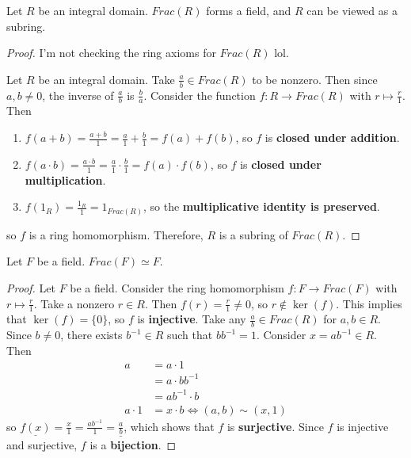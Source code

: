 \documentclass [12pt] {article}
\newenvironment{theorem}[1]{\begin{tcolorbox}[title={Theorem #1},colback=green!5!white,colframe=black!75!green]}{\end{tcolorbox}}
\newenvironment{corollary}[1]{\begin{tcolorbox}[title={Corollary #1}]}{\end{tcolorbox}}
\renewcommand{\bf}[1]{\textbf{{#1}}}
\newcommand{\ul}[1]{\underline{{#1}}}
\begin{document}
\begin{theorem}{}
    Let $R$ be an integral domain. $Frac(R)$ forms a field, and $R$ can be viewed as a subring.
\end{theorem}
\begin{proof}
    I'm not checking the ring axioms for $Frac(R)$ lol.
    \vspace{0.5em}

    Let $R$ be an integral domain. Take $\frac{a}{b} \in Frac(R)$ to be nonzero. Then since
    $a, b \neq 0$, the inverse of $\frac{a}{b}$ is $\frac{b}{a}$. Consider the function
    $f : R \to Frac(R)$ with $r \mapsto \frac{r}{1}$. Then
    \begin{enumerate}[label=(\arabic*)]
        \item $f(a + b) = \frac{a + b}{1} = \frac{a}{1} + \frac{b}{1} = f(a) + f(b)$, so $f$ is
            \bf{closed under addition}.
        \item $f(a \cdot b) = \frac{a \cdot b}{1} = \frac{a}{1} \cdot \frac{b}{1} = f(a) \cdot f(b)$,
            so $f$ is \bf{closed under multiplication}.
        \item $f(1_R) = \frac{1_R}{1} = 1_{Frac(R)}$, so the \bf{multiplicative identity is preserved}.
    \end{enumerate}
    so $f$ is a ring homomorphism. Therefore, $R$ is a subring of $Frac(R)$.
\end{proof}

\begin{corollary}{}
    Let $F$ be a field. $Frac(F) \simeq F$.
\end{corollary}
\begin{proof}
    Let $F$ be a field. Consider the ring homomorphism $f : F \to Frac(F)$ with $r \mapsto \frac{r}{1}$.
    Take a nonzero $r \in R$. Then $f(r) = \frac{r}{1} \neq 0$, so
    $r \not \in \ker(f)$. This implies that $\ker(f) = \{ 0 \}$, so $f$ is \bf{injective}. Take any
    $\frac{a}{b} \in Frac(R)$ for $a, b \in R$. Since $b \neq 0$, there exists $b^{-1} \in R$ such
    that $bb^{-1} = 1$. Consider $x = ab^{-1} \in R$. Then
    \begin{align*}
        a &= a \cdot 1 \\
          &= a \cdot bb^{-1} \\
          &= ab^{-1} \cdot b \\
        a \cdot 1 &= x \cdot b \iff (a, b) \sim (x, 1)
    \end{align*}
    so $\ul{f(x)} = \frac{x}{1} = \frac{ab^{-1}}{1} = \ul{\frac{a}{b}}$, which shows that $f$ is
    \bf{surjective}. Since $f$ is injective and surjective, $f$ is a \bf{bijection}.
\end{proof}
\end{document}
